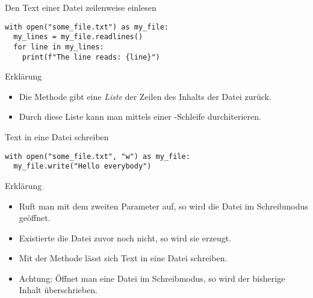 \begin{fragile}
\begin{block}{Den Text einer Datei zeilenweise einlesen}
\pause 
\vspace{2pt}

\begin{verbatim}
with open("some_file.txt") as my_file:
  my_lines = my_file.readlines()
  for line in my_lines:
    print(f"The line reads: {line}")
\end{verbatim}

\pause
\vspace{12pt}

\begin{exampleblock}{Erklärung}
\vspace{2pt}
\begin{itemize}[<+->]
\item Die Methode  gibt eine \emph{Liste} der Zeilen des Inhalts der Datei  zurück. 
\item Durch diese Liste kann man mittels einer -Schleife durchiterieren. 
\end{itemize}
\end{exampleblock}
\end{block}


\end{fragile}


\begin{fragile}
\begin{block}{Text in eine Datei schreiben}
\pause 
\vspace{2pt}

\begin{verbatim}
with open("some_file.txt", "w") as my_file:
  my_file.write("Hello everybody")
\end{verbatim}

\pause
\vspace{12pt}

\begin{exampleblock}{Erklärung}
\vspace{2pt}
\begin{itemize}[<+->]
\item Ruft man  mit dem zweiten Parameter  auf, so wird die Datei im Schreibmodus geöffnet. 
\item Existierte die Datei zuvor noch nicht, so wird sie erzeugt. 
\item Mit der Methode  lässt sich Text in eine Datei schreiben. 
\item Achtung: Öffnet man eine Datei im Schreibmodus, so wird der bisherige Inhalt überschrieben. 
\end{itemize}
\end{exampleblock}
\end{block}
\end{fragile}

